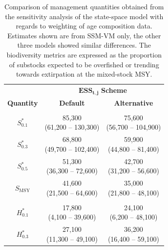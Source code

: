 \documentclass[12pt,]{book}
\theoremstyle{definition}
\theoremstyle{definition}
\theoremstyle{definition}
\theoremstyle{remark}
\begin{document}
\clearpage

\begin{table}

\caption{\label{tab:alt-ess-table}Comparison of management quantities obtained from the sensitivity analysis of the state-space model with regards to weighting of age composition data. Estimates shown are from SSM-VM only, the other three models showed similar differences. The biodiversity metrics are expressed as the proportion of substocks expected to be overfished or trending towards extirpation at the mixed-stock MSY.}
\centering
\begin{tabular}[t]{ccc}
\toprule
\multicolumn{1}{c}{} & \multicolumn{2}{c}{$\boldsymbol{ESS_{t,j}}$ \textbf{Scheme}} \\
\cmidrule(l{2pt}r{2pt}){2-3}
\textbf{Quantity} & \textbf{Default} & \textbf{Alternative}\\
\midrule
\addlinespace[0.3em]
\multicolumn{3}{l}{\textbf{Escapement}}\\
\hline
\hspace{1em}$S^*_{0.1}$ & \makecell[c]{85,300\\(61,200 -- 130,300)} & \makecell[c]{75,600\\(56,700 -- 104,900)}\\
\hspace{1em}$S^*_{0.3}$ & \makecell[c]{68,800\\(49,700 -- 102,400)} & \makecell[c]{59,900\\(44,800 -- 81,400)}\\
\hspace{1em}$S^*_{0.5}$ & \makecell[c]{51,300\\(36,300 -- 72,600)} & \makecell[c]{42,700\\(31,200 -- 56,600)}\\
\hspace{1em}$S_{\text{MSY}}$ & \makecell[c]{41,600\\(21,500 -- 64,600)} & \makecell[c]{35,000\\(21,800 -- 48,100)}\\
\addlinespace[0.3em]
\multicolumn{3}{l}{\textbf{Harvest}}\\
\hline
\hspace{1em}$H^*_{0.1}$ & \makecell[c]{17,800\\(4,100 -- 39,600)} & \makecell[c]{24,100\\(6,200 -- 48,100)}\\
\hspace{1em}$H^*_{0.3}$ & \makecell[c]{27,100\\(11,300 -- 49,100)} & \makecell[c]{36,200\\(16,400 -- 59,100)}\\

\end{tabular}
\end{table}
\end{document}
